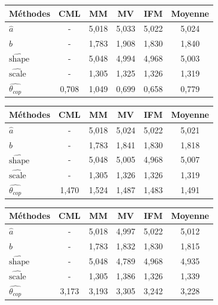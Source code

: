\begin{center}
\begin{tabular}{| l | c | c | c | c | c |}
 \hline			
   Méthodes & CML & MM & MV & IFM & Moyenne \\
  \hline
   $\widehat{a}$ & - & 5,018 & 5,033 & 5,022 & 5,024 \\
    $\widehat{b}$ & - & 1,783 & 1,908 & 1,830 & 1,840 \\
    $\widehat{\text{shape}}$ & - & 5,048 & 4,994 & 4,968 & 5,003 \\
    $\widehat{\text{scale}}$ & - & 1,305 & 1,325 & 1,326 & 1,319 \\
    $\widehat{\theta_{cop}}$ & 0,708 & 1,049 & 0,699 & 0,658 & 0,779 \\
 \hline  
 \end{tabular}
\label{tab1}
\end{center}

\begin{center}
\begin{tabular}{| l | c | c | c | c | c |}
 \hline			
   Méthodes & CML & MM & MV & IFM & Moyenne \\
  \hline
   $\widehat{a}$ & - & 5,018 & 5,024 & 5,022 & 5,021 \\
    $\widehat{b}$ & - & 1,783 & 1,841 & 1,830 & 1,818 \\
    $\widehat{\text{shape}}$ & - & 5,048 & 5,005 & 4,968 & 5,007 \\
    $\widehat{\text{scale}}$ & - & 1,305 & 1,326 & 1,326 & 1,319 \\
    $\widehat{\theta_{cop}}$ & 1,470 & 1,524 & 1,487 & 1,483 & 1,491 \\
 \hline  
 \end{tabular}
\label{tab2}
\end{center}

\begin{center}
\begin{tabular}{| l | c | c | c | c | c |}
 \hline			
   Méthodes & CML & MM & MV & IFM & Moyenne \\
  \hline
   $\widehat{a}$ & - & 5,018 & 4,997 & 5,022 & 5,012 \\
    $\widehat{b}$ & - & 1,783 & 1,832 & 1,830 & 1,815 \\
    $\widehat{\text{shape}}$ & - & 5,048 & 4,789 & 4,968 & 4,935 \\
    $\widehat{\text{scale}}$ & - & 1,305 & 1,386 & 1,326 & 1,339 \\
    $\widehat{\theta_{cop}}$ & 3,173 & 3,193 & 3,305 & 3,242 & 3,228 \\
 \hline  
 \end{tabular}
\label{tab3}
\end{center}

